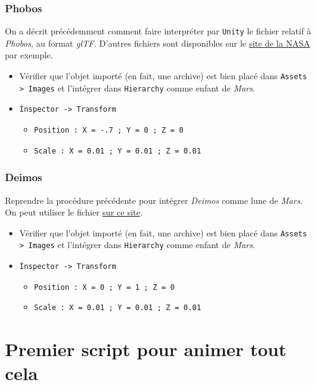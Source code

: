 \documentclass[a4paper,10pt]{article}
\newenvironment{solution}%
{\begin{tcolorbox}[breakable,colback=red!5!white,colframe=red!75!black,title=Solution]}%
{\end{tcolorbox}}
\begin{document}
\begin{solution}
\begin{itemize}
\subsubsection{Phobos}
On a décrit précédemment comment faire interpréter par \texttt{Unity} le fichier relatif à \textit{Phobos}, au format \textit{glTF}. D'autres fichiers sont disponibles sur le \href{https://solarsystem.nasa.gov/resources/2358/phobos-3d-model/}{site de la NASA} par exemple.

\begin{itemize}
	\item  Vérifier que l'objet importé (en fait, une archive) est bien placé dans \texttt{Assets > Images} et l'intégrer dans  \texttt{Hierarchy} comme enfant de \textit{Mars}.
	\item \texttt{Ìnspector -> Transform}
	\begin{itemize}
		\item \texttt{Position : X = -.7 ; Y = 0 ; Z = 0 }
		\item \texttt{Scale : X = 0.01 ; Y = 0.01 ; Z = 0.01} 
	\end{itemize}	
\end{itemize}


\subsubsection{Deimos}
Reprendre la procédure précédente pour intégrer \textit{Deimos} comme lune de \textit{Mars}. On peut utiliser le fichier \href{https://science.nasa.gov/resource/deimos-mars-moon-3d-model/}{sur ce site}.

\begin{itemize}
	\item  Vérifier que l'objet importé (en fait, une archive) est bien placé dans \texttt{Assets > Images} et l'intégrer dans  \texttt{Hierarchy} comme enfant de \textit{Mars}.
	\item \texttt{Ìnspector -> Transform}
	\begin{itemize}
		\item \texttt{Position : X = 0 ; Y = 1 ; Z = 0 }
		\item \texttt{Scale : X = 0.01 ; Y = 0.01 ; Z = 0.01} 
	\end{itemize}	
\end{itemize}

\end{itemize}
\end{solution}
\fi 

\section{Premier script pour animer tout cela}
\end{document}
